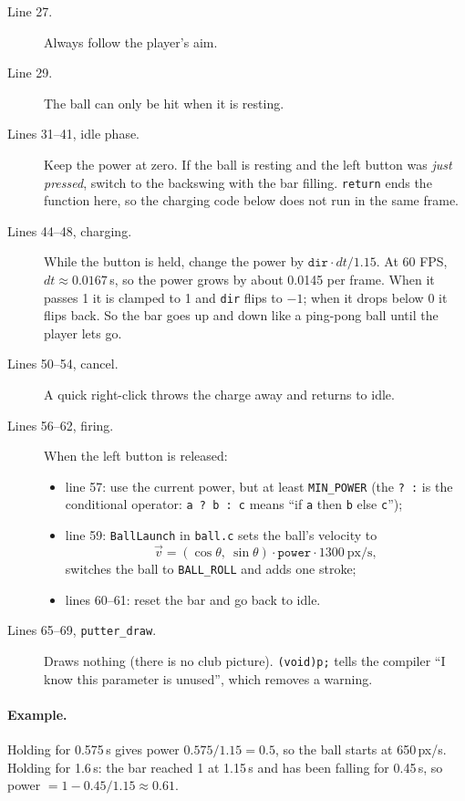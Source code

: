 \documentclass[11pt,a4paper]{article}
\newcommand{\code}[3]{}
\begin{document}
\code{putter_simple.c}{26}{69}

\begin{description}
  \item[Line 27.] Always follow the player's aim.
  \item[Line 29.] The ball can only be hit when it is resting.
  \item[Lines 31--41, idle phase.] Keep the power at zero. If the ball is resting and the left button was
  \emph{just pressed}, switch to the backswing with the bar filling. \texttt{return} ends the function here, so the
  charging code below does not run in the same frame.
  \item[Lines 44--48, charging.] While the button is held, change the power by
  $\texttt{dir}\cdot dt / 1.15$. At 60 FPS, $dt \approx 0.0167$\,s, so the power grows by about 0.0145 per frame.
  When it passes 1 it is clamped to 1 and \texttt{dir} flips to $-1$; when it drops below 0 it flips back.
  So the bar goes up and down like a ping-pong ball until the player lets go.
  \item[Lines 50--54, cancel.] A quick right-click throws the charge away and returns to idle.
  \item[Lines 56--62, firing.] When the left button is released:
  \begin{itemize}
    \item line 57: use the current power, but at least \texttt{MIN\_POWER} (the \texttt{? :} is the conditional
    operator: \texttt{a ? b : c} means ``if \texttt{a} then \texttt{b} else \texttt{c}'');
    \item line 59: \texttt{BallLaunch} in \texttt{ball.c} sets the ball's velocity to
    \[ \vec v = (\cos\theta,\ \sin\theta)\cdot \texttt{power}\cdot 1300\ \text{px/s}, \]
    switches the ball to \texttt{BALL\_ROLL} and adds one stroke;
    \item lines 60--61: reset the bar and go back to idle.
  \end{itemize}
  \item[Lines 65--69, \texttt{putter\_draw}.] Draws nothing (there is no club picture). \texttt{(void)p;} tells the
  compiler ``I know this parameter is unused'', which removes a warning.
\end{description}

\paragraph{Example.} Holding for 0.575\,s gives power $0.575/1.15 = 0.5$, so the ball starts at 650\,px/s.
Holding for 1.6\,s: the bar reached 1 at 1.15\,s and has been falling for 0.45\,s, so power $= 1 - 0.45/1.15
\approx 0.61$.
\end{document}
